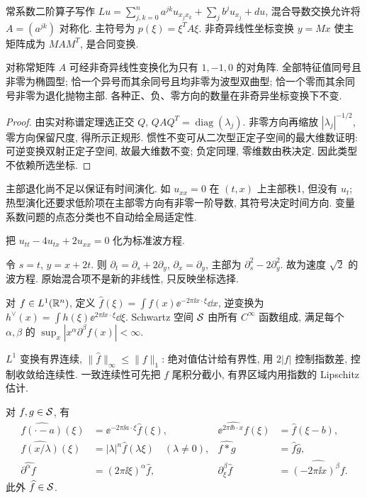\label{ch:fourier}
常系数二阶算子写作 $Lu=\sum_{j,k=0}^n a^{jk}u_{x_jx_k}+\sum_jb^ju_{x_j}+du$, 混合导数交换允许将 $A=(a^{jk})$ 对称化. 主符号为 $p(\xi)=\xi^TA\xi$. 非奇异线性坐标变换 $y=Mx$ 使主矩阵成为 $MAM^T$, 是合同变换.
\begin{theorem}\label{thm:classification}
对称常矩阵 $A$ 可经非奇异线性变换化为只有 $1,-1,0$ 的对角阵. 全部特征值同号且非零为椭圆型; 恰一个异号而其余同号且均非零为波型双曲型; 恰一个零而其余同号非零为退化抛物主部. 各种正、负、零方向的数量在非奇异坐标变换下不变.
\end{theorem}
\begin{proof}
由实对称谱定理选正交 $Q$, $QAQ^T=\operatorname{diag}(\lambda_j)$. 非零方向再缩放 $|\lambda_j|^{-1/2}$, 零方向保留尺度, 得所示正规形. 惯性不变可从二次型正定子空间的最大维数证明: 可逆变换双射正定子空间, 故最大维数不变; 负定同理, 零维数由秩决定. 因此类型不依赖所选坐标.
\end{proof}
主部退化尚不足以保证有时间演化. 如 $u_{xx}=0$ 在 $(t,x)$ 上主部秩1, 但没有 $u_t$; 热型演化还要求低阶项在主部零方向有非零一阶导数, 其符号决定时间方向. 变量系数问题的点态分类也不自动给全局适定性.
\begin{example}
把 $u_{tt}-4u_{tx}+2u_{xx}=0$ 化为标准波方程.
\end{example}
\begin{solution}
令 $s=t$, $y=x+2t$. 则 $\partial_t=\partial_s+2\partial_y$, $\partial_x=\partial_y$, 主部为 $\partial_s^2-2\partial_y^2$. 故为速度 $\sqrt2$ 的波方程. 原始混合项不是新的非线性, 只反映坐标选择.
\end{solution}
\begin{definition}
对 $f\in L^1(\mathbb R^n)$, 定义 $\widehat f(\xi)=\int f(x)\ee^{-2\pi\ii x\cdot\xi}\dd x$, 逆变换为 $h^\vee(x)=\int h(\xi)\ee^{2\pi\ii x\cdot\xi}\dd\xi$. Schwartz 空间 $\mathcal S$ 由所有 $C^\infty$ 函数组成, 满足每个 $\alpha,\beta$ 的 $\sup_x|x^\alpha\partial^\beta f(x)|<\infty$.
\end{definition}
$L^1$ 变换有界连续, $\|\widehat f\|_\infty\le\|f\|_1$: 绝对值估计给有界性, 用 $2|f|$ 控制指数差, 控制收敛给连续性. 一致连续性可先把 $f$ 尾积分截小, 有界区域内用指数的 Lipschitz 估计.
\begin{proposition}\label{prop:fourierprops}
对 $f,g\in\mathcal S$, 有
\begin{align*}
\widehat{f(\cdot-a)}(\xi)&=\ee^{-2\pi\ii a\cdot\xi}\widehat f(\xi),&
\widehat{\ee^{2\pi\ii b\cdot x}f}(\xi)&=\widehat f(\xi-b),\\
\widehat{f(x/\lambda)}(\xi)&=|\lambda|^n\widehat f(\lambda\xi)\quad(\lambda\ne0),&
\widehat{f*g}&=\widehat f\widehat g,\\
\widehat{\partial^\alpha f}&=(2\pi\ii\xi)^\alpha\widehat f,&
\partial_\xi^\beta\widehat f&=\widehat{(-2\pi\ii x)^\beta f}.
\end{align*}
此外 $\widehat f\in\mathcal S$.
\end{proposition}
